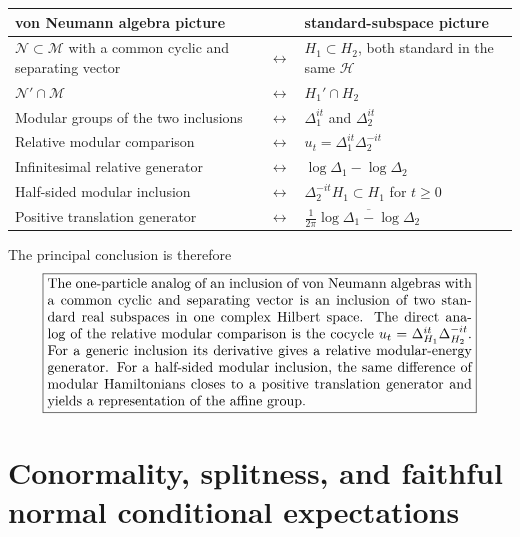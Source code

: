 \documentclass[a4paper,11pt]{article}
\theoremstyle{definition}
\newcommand{\cH}{\mathcal{H}}
\begin{document}
\renewcommand{\arraystretch}{1.45}
\setlength{\tabcolsep}{4pt}
\begin{center}
\begin{tabular}{>{\raggedright\arraybackslash}p{}
                >{\centering\arraybackslash}p{}
                >{\raggedright\arraybackslash}p{}}
\toprule
\textbf{von Neumann algebra picture}
& &
\textbf{standard-subspace picture}\\
\midrule
$\mathcal{N}\subset\mathcal{M}$ with a common cyclic and separating vector
& $\longleftrightarrow$ &
$H_1\subset H_2$, both standard in the same $\cH$\\
$\mathcal{N}'\cap\mathcal{M}$
& $\longleftrightarrow$ &
$H_1'\cap H_2$\\
Modular groups of the two inclusions
& $\longleftrightarrow$ &
$\Delta_1^{it}$ and $\Delta_2^{it}$\\
Relative modular comparison
& $\longleftrightarrow$ &
$u_t=\Delta_1^{it}\Delta_2^{-it}$\\
Infinitesimal relative generator
& $\longleftrightarrow$ &
$\log\Delta_1-\log\Delta_2$\\
Half-sided modular inclusion
& $\longleftrightarrow$ &
$\Delta_2^{-it}H_1\subset H_1$ for $t\geq0$\\
Positive translation generator
& $\longleftrightarrow$ &
$\frac{1}{2\pi}\overline{\log\Delta_1-\log\Delta_2}$\\
\bottomrule
\end{tabular}
\end{center}

The principal conclusion is therefore
\[
\boxed{
\begin{minipage}{0.88\textwidth}
The one-particle analog of an inclusion of von Neumann algebras with a
common cyclic and separating vector is an inclusion of two standard real
subspaces in one complex Hilbert space.  The direct analog of the relative
modular comparison is the cocycle
$u_t=\Delta_{H_1}^{it}\Delta_{H_2}^{-it}$.  For a generic inclusion its
derivative gives a relative modular-energy generator.  For a half-sided
modular inclusion, the same difference of modular Hamiltonians closes to
a positive translation generator and yields a representation of the
affine group.
\end{minipage}
}
\]
\section{Conormality, splitness, and faithful normal conditional expectations}
\label{sec:conormality-expectations}
\end{document}
